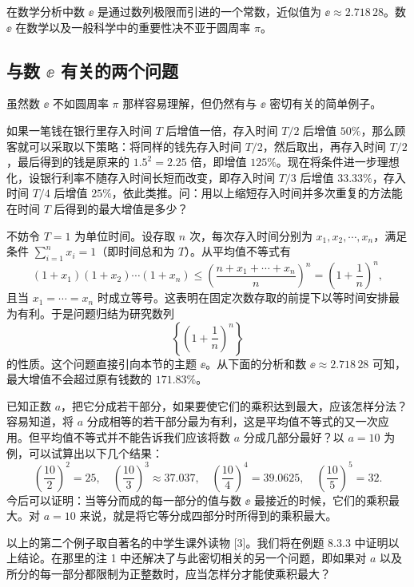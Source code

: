在数学分析中数 $\ee$ 是通过数列极限而引进的一个常数，近似值为 $\ee\approx2.718\,28$。数 $\ee$ 在数学以及一般科学中的重要性决不亚于圆周率 $\pi$。

\subsection{\texorpdfstring{与数 $\ee$ 有关的两个问题}{与数 e 有关的两个问题}}

虽然数 $\ee$ 不如圆周率 $\pi$ 那样容易理解，但仍然有与 $\ee$ 密切有关的简单例子。

\begin{xexample}[2.5.1]
如果一笔钱在银行里存入时间 $T$ 后增值一倍，存入时间 $T/2$ 后增值 $50\%$，那么顾客就可以采取以下策略：将同样的钱先存入时间 $T/2$，然后取出，再存入时间 $T/2$，最后得到的钱是原来的 $1.5^2=2.25$ 倍，即增值 $125\%$。现在将条件进一步理想化，设银行利率不随存入时间长短而改变，即存入时间 $T/3$ 后增值 $33.33\%$，存入时间 $T/4$ 后增值 $25\%$，依此类推。问：用以上缩短存入时间并多次重复的方法能在时间 $T$ 后得到的最大增值是多少？
\end{xexample}
\begin{xsolution}
不妨令 $T=1$ 为单位时间。设存取 $n$ 次，每次存入时间分别为 $x_1,x_2,\cdots,x_n$，满足条件 $\sum_{i=1}^n x_i=1$（即时间总和为 $T$）。从平均值不等式有
\[
  (1+x_1)(1+x_2)\cdots(1+x_n)
  \le\left(\frac{n+x_1+\cdots+x_n}{n}\right)^n
  =\left(1+\frac1n\right)^n,
\]
且当 $x_1=\cdots=x_n$ 时成立等号。这表明在固定次数存取的前提下以等时间安排最为有利。于是问题归结为研究数列
\[
  \left\{\left(1+\frac1n\right)^n\right\}
\]
的性质。这个问题直接引向本节的主题 $\ee$。从下面的分析和数 $\ee\approx2.718\,28$ 可知，最大增值不会超过原有钱数的 $171.83\%$。
\end{xsolution}

\begin{xexample}[2.5.2]
已知正数 $a$，把它分成若干部分，如果要使它们的乘积达到最大，应该怎样分法？容易知道，将 $a$ 分成相等的若干部分最为有利，这是平均值不等式的又一次应用。但平均值不等式并不能告诉我们应该将数 $a$ 分成几部分最好？以 $a=10$ 为例，可以试算出以下几个结果：
\[
  \left(\frac{10}{2}\right)^2=25,\quad
  \left(\frac{10}{3}\right)^3\approx37.037,\quad
  \left(\frac{10}{4}\right)^4=39.0625,\quad
  \left(\frac{10}{5}\right)^5=32.
\]
今后可以证明：当等分而成的每一部分的值与数 $\ee$ 最接近的时候，它们的乘积最大。对 $a=10$ 来说，就是将它等分成四部分时所得到的乘积最大。
\end{xexample}

\begin{xremark}
以上的第二个例子取自著名的中学生课外读物 [3]。我们将在例题 8.3.3 中证明以上结论。在那里的注 1 中还解决了与此密切相关的另一个问题，即如果对 $a$ 以及所分的每一部分都限制为正整数时，应当怎样分才能使乘积最大？
\end{xremark}

